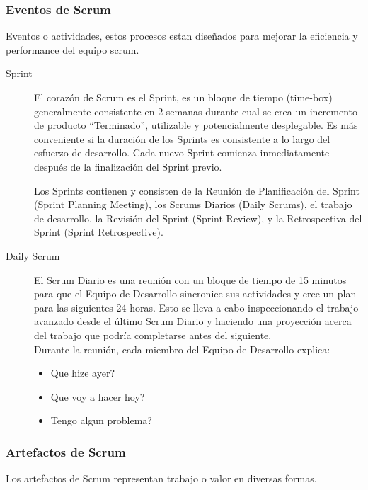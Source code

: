 
  \subsubsection{Eventos de Scrum}
  \label{subs:scrum_events}
  Eventos o actividades, estos procesos estan dise\~nados para mejorar la eficiencia  y performance del equipo scrum.

  \begin{description}
    \item[Sprint]
    El corazón de Scrum es el Sprint, es un bloque de tiempo (time-box) generalmente consistente en 2 semanas durante  cual se crea un incremento de producto “Terminado”, utilizable y potencialmente desplegable. Es más conveniente si la duración de los Sprints es consistente a lo largo del esfuerzo de desarrollo. Cada nuevo Sprint comienza inmediatamente después de la finalización del Sprint previo.

    Los Sprints contienen y consisten de la Reunión de Planificación del Sprint (Sprint Planning Meeting), los Scrums Diarios (Daily Scrums), el trabajo de desarrollo, la Revisión del Sprint (Sprint Review), y la Retrospectiva del Sprint (Sprint Retrospective).

    \item[Daily Scrum]

    El Scrum Diario es una reunión con un bloque de tiempo de 15 minutos para que el Equipo de Desarrollo sincronice sus actividades y cree un plan para las siguientes 24 horas. Esto se lleva a cabo inspeccionando el trabajo avanzado desde el último Scrum Diario y haciendo una proyección acerca del trabajo que podría completarse antes del siguiente. \\
    Durante la reunión, cada miembro del Equipo de Desarrollo explica:
    \begin{itemize}
      \item Que hize ayer?
      \item Que voy a hacer hoy?
      \item Tengo algun problema?
    \end{itemize}

  \end{description}


  \subsubsection{Artefactos de Scrum}
  \label{subs:artefactos_de_scrum}
    Los artefactos de Scrum representan trabajo o valor en diversas formas.

